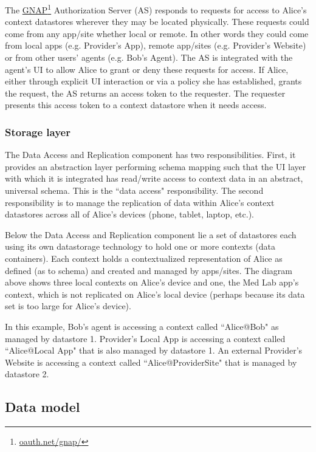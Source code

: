 \documentclass[11pt, oneside]{article}   	%
\newcommand{\hyperfootnote}[1][]{\def\ArgI{{#1}}\hyperfootnoteRelay}
\newcommand\hyperfootnoteRelay[2][]{\href{#1#2}{\ArgI}\footnote{\href{#1#2}{#2}}}
\begin{document}
The \hyperfootnote[GNAP][https://]{oauth.net/gnap/} Authorization Server (AS) responds to requests for access to Alice's context datastores wherever they may be located physically. These requests could come from any app/site whether local or remote. In other words they could come from local apps (e.g. Provider's App), remote app/sites (e.g. Provider's Website) or from other users' agents (e.g. Bob's Agent). The AS is integrated with the agent's UI to allow Alice to grant or deny these requests for access. If Alice, either through explicit UI interaction or via a policy she has established, grants the request, the AS returns an access token to the requester. The requester presents this access token to a context datastore when it needs access. 

\subsubsection{Storage layer}

The Data Access and Replication component has two responsibilities. First, it provides an abstraction layer performing schema mapping such that the UI layer with which it is integrated has read/write access to context data in an abstract, universal schema. This is the ``data access" responsibility. The second responsibility is to manage the replication of data within Alice's context datastores across all of Alice's devices (phone, tablet, laptop, etc.). 

Below the Data Access and Replication component lie a set of datastores each using its own datastorage technology to hold one or more contexts (data containers). Each context holds a contextualized representation of Alice as defined (as to schema) and created and managed by apps/sites. The diagram above shows three local contexts on Alice's device and one, the Med Lab app's context, which is not replicated on Alice's local device (perhaps because its data set is too large for Alice's device).

In this example, Bob's agent is accessing a context called ``Alice@Bob" as managed by datastore 1. Provider's Local App is accessing a context called ``Alice@Local App" that is also managed by datastore 1.  An external Provider's Website is accessing a context called ``Alice@ProviderSite" that is managed by datastore 2. 

\subsection{Data model} %
\end{document}
